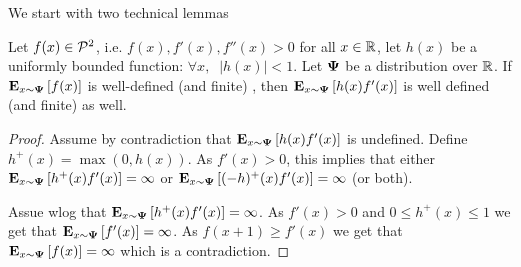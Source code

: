 \documentclass[anon,12pt]{colt2024} %
\begin{document}
We start with two technical lemmas
\begin{lemma} \label{lemma:infiniteexpectations}
Let $f(x) \in {\cal P}^{2}$, i.e. $f(x), f'(x),f''(x) >0$ for all $x \in
\mathbb{R}$, let $h(x)$ be a uniformly bounded function: $\forall x,\;\; |h(x)|<1$.
Let ${\bf \Psi}$ be a distribution over $\mathbb{R}$.
If ${\bf E}_{x \sim {\bf \Psi}}\left[ f(x) \right]$ is well-defined (and finite) , then 
${\bf E}_{x \sim {\bf \Psi}}\left[ h(x) f'(x) \right]$ is well defined (and finite) as well.
\end{lemma}
\begin{proof}
Assume by contradiction that ${\bf E}_{x \sim {\bf \Psi}}\left[ h(x) f'(x) \right]$ is
undefined. Define $h^+(x) = \max(0,h(x))$.
As $f'(x)>0$, this implies that either ${\bf E}_{x \sim {\bf \Psi}}\left[ h^+(x)
  f'(x) \right]=\infty$ or ${\bf E}_{x \sim {\bf \Psi}}\left[ (-h)^+(x) f'(x) \right]=\infty$ (or both). 

Assue wlog that ${\bf E}_{x \sim {\bf \Psi}}\left[ h^+(x) f'(x) \right]=\infty$. As
$f'(x)>0$ and $0 \leq h^+(x) \leq 1$ we get that ${\bf E}_{x \sim
  {\bf \Psi}}\left[ f'(x) \right]=\infty$.
As $f(x+1) \geq f'(x)$ we get that $\E{x \sim
  \state}{f(x)}=\infty$ which is a contradiction.
\end{proof}

\iffalse
$\epsilon>0$ such that
for any $v>0$ there exists $|h_v(x)| < v$ such that 
$|\E{x \sim \state}{h_v(x) f'(x)}|>\epsilon$. Define $h'_v =
\frac{h_v}{v}$. Clearly $|h'_v(x)|<1$ and we have that
$$|\E{x \sim \state}{h'_v(x) f'(x)}|>\frac{\epsilon}{v}$$

Define the positive parts of $h_v$ to be $h_v^+(x) = \max(0,h'_v(x))$
and $h_v^-(x) = \max(0,-h'_v(x))$. As $f'(x)>0$ we that either
\[
  \E{x \sim \state}{h^+_v(x) f'(x)}>\frac{\epsilon}{v}
\]
or 
\[
  \E{x \sim \state}{h^-_v(x) f'(x)}>\frac{\epsilon}{v}
\]
Wlog assume the first. As $f \in \SP{2}$, we have that $f(x+1) \geq f'(x)$. Therefore
 $\E{x \sim \state}{f(x+1)|h_v^(x)>0)}=\infty$. As $f(x)>0$ for all $x$ we
 find that $\E{x \sim \state}{f(x)}=\infty$ which contradicts the
 Lemma's assumption.
\end{proof}
\fi
\end{document}
